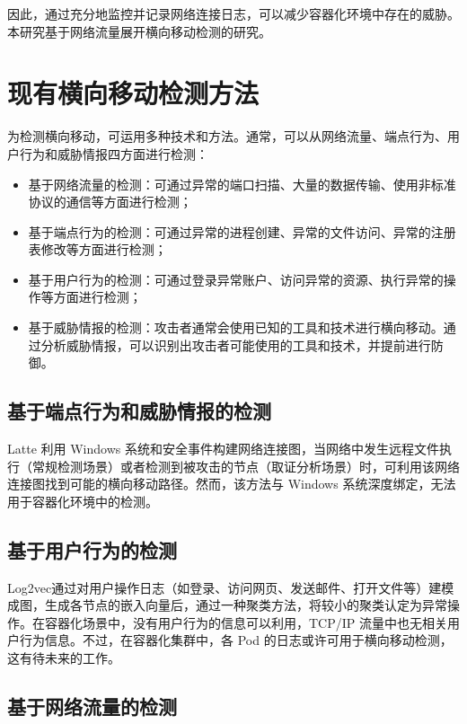 {因此，通过充分地监控并记录网络连接日志，可以减少容器化环境中存在的威胁。本研究基于网络流量展开横向移动检测的研究。

\section{现有横向移动检测方法}

为检测横向移动，可运用多种技术和方法。通常，可以从网络流量、端点行为、用户行为和威胁情报四方面进行检测：

\begin{itemize}
    \item 基于网络流量的检测：可通过异常的端口扫描、大量的数据传输、使用非标准协议的通信等方面进行检测；
    \item 基于端点行为的检测：可通过异常的进程创建、异常的文件访问、异常的注册表修改等方面进行检测；
    \item 基于用户行为的检测：可通过登录异常账户、访问异常的资源、执行异常的操作等方面进行检测；
    \item 基于威胁情报的检测：攻击者通常会使用已知的工具和技术进行横向移动。通过分析威胁情报，可以识别出攻击者可能使用的工具和技术，并提前进行防御。
\end{itemize}

\subsection{基于端点行为和威胁情报的检测}

Latte\citep{liu2018latte} 利用 Windows 系统和安全事件构建网络连接图，当网络中发生远程文件执行（常规检测场景）或者检测到被攻击的节点（取证分析场景）时，可利用该网络连接图找到可能的横向移动路径。然而，该方法与 Windows 系统深度绑定，无法用于容器化环境中的检测。

\subsection{基于用户行为的检测}

Log2vec\citep{liu2019log2vec}通过对用户操作日志（如登录、访问网页、发送邮件、打开文件等）建模成图，生成各节点的嵌入向量后，通过一种聚类方法，将较小的聚类认定为异常操作。在容器化场景中，没有用户行为的信息可以利用，TCP/IP 流量中也无相关用户行为信息。不过，在容器化集群中，各 Pod 的日志或许可用于横向移动检测，这有待未来的工作。

\subsection{基于网络流量的检测}

}
